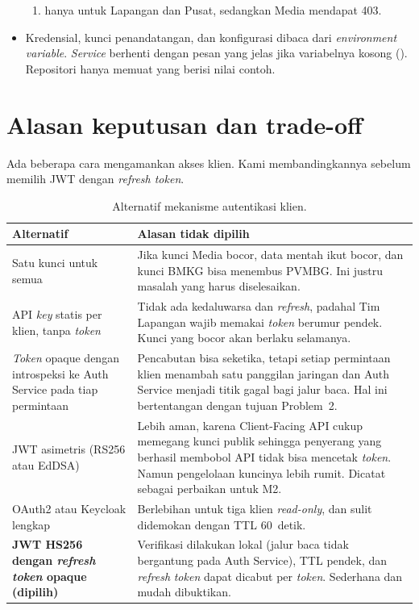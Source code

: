 \begin{itemize}
\begin{enumerate}
   \item {} hanya untuk Lapangan dan Pusat, sedangkan Media mendapat 403.
  \end{enumerate}
 \item Kredensial, kunci penandatangan, dan konfigurasi dibaca dari \emph{environment variable}. \emph{Service} berhenti dengan pesan yang jelas jika variabelnya kosong (). Repositori hanya memuat  yang berisi nilai contoh.
\end{itemize}



\section{Alasan keputusan dan trade-off}

Ada beberapa cara mengamankan akses klien. Kami membandingkannya sebelum memilih JWT dengan \emph{refresh token}.

\begin{table}[H]
\centering\small
\begin{tabularx}{\textwidth}{@{}L{4.0cm}Y@{}}
\toprule
\textbf{Alternatif} & \textbf{Alasan tidak dipilih}\\
\midrule
Satu kunci untuk semua & Jika kunci Media bocor, data mentah ikut bocor, dan kunci BMKG bisa menembus PVMBG. Ini justru masalah yang harus diselesaikan.\\
API \emph{key} statis per klien, tanpa \emph{token} & Tidak ada kedaluwarsa dan \emph{refresh}, padahal Tim Lapangan wajib memakai \emph{token} berumur pendek. Kunci yang bocor akan berlaku selamanya.\\
\emph{Token} opaque dengan introspeksi ke Auth Service pada tiap permintaan & Pencabutan bisa seketika, tetapi setiap permintaan klien menambah satu panggilan jaringan dan Auth Service menjadi titik gagal bagi jalur baca. Hal ini bertentangan dengan tujuan Problem~2.\\
JWT asimetris (RS256 atau EdDSA) & Lebih aman, karena Client-Facing API cukup memegang kunci publik sehingga penyerang yang berhasil membobol API tidak bisa mencetak \emph{token}. Namun pengelolaan kuncinya lebih rumit. Dicatat sebagai perbaikan untuk M2.\\
OAuth2 atau Keycloak lengkap & Berlebihan untuk tiga klien \emph{read-only}, dan sulit didemokan dengan TTL 60~detik.\\
\textbf{JWT HS256 dengan \emph{refresh} \emph{token} opaque (dipilih)} & Verifikasi dilakukan lokal (jalur baca tidak bergantung pada Auth Service), TTL pendek, dan \emph{refresh} \emph{token} dapat dicabut per \emph{token}. Sederhana dan mudah dibuktikan.\\
\bottomrule
\end{tabularx}
\caption{Alternatif mekanisme autentikasi klien.}
\end{table}

